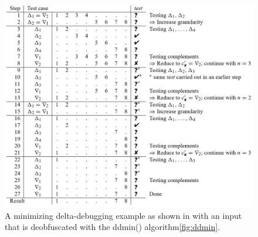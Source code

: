 \begin{figure}
	\centering
	\includegraphics[width=1.0\textwidth]{images/ddminExampleFromPaper5}
	\caption{A minimizing delta-debugging example as shown in \cite{5zeller2002simplifyingIsolatingFailure-inducing} with an input that is deobfuscated with the ddmin() algorithm\ref{fig:ddmin}.}
	\label{fig:ddminExample}
\end{figure}

